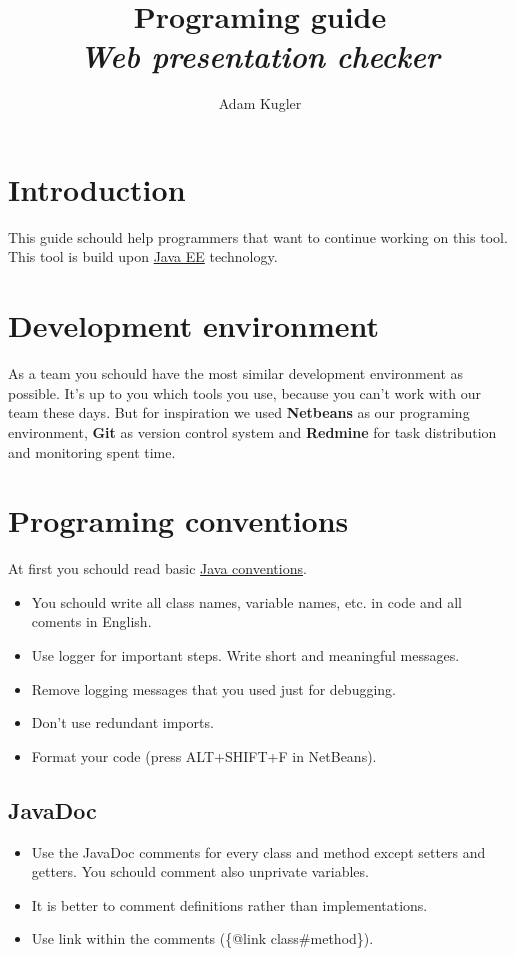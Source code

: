 \documentclass[12pt,a4paper]{article}
\author{Adam Kugler}
\title{Programing guide\\\textit{Web presentation checker}}
\begin{document}
\maketitle
\tableofcontents
\newpage

\section {Introduction}
This guide schould help programmers that want to continue working on this tool. This tool is build upon
\href{http://www.oracle.com/technetwork/java/javaee/overview/index.html}{Java EE} technology.

\section {Development environment}
As a team you schould have the most similar development environment as possible. It's up to you which tools you use, because you can't work with our team these days. But for inspiration we used \textbf{Netbeans} as our programing environment, \textbf{Git} as version control system and \textbf{Redmine} for task distribution and monitoring spent time.

\section{Programing conventions}
At first you schould read basic \href{http://www.oracle.com/technetwork/java/codeconvtoc-136057.html}{Java conventions}.
\begin{itemize}
\item You schould write all class names, variable names, etc. in code and all coments in English.
\item Use logger for important steps. Write short and meaningful messages.
\item Remove logging messages that you used just for debugging.
\item Don't use redundant imports.
\item Format your code (press ALT+SHIFT+F in NetBeans).
\end{itemize}
\subsection{JavaDoc}
\begin{itemize}
\item Use the JavaDoc comments for every class and method except setters and getters. You schould comment also unprivate variables.
\item It is better to comment definitions rather than implementations.
\item Use link within the comments (\{@link class\#method\}).
\end{itemize}
\end{document}
